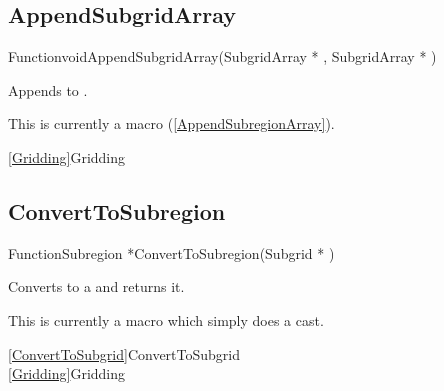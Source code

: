 \newpage
\subsection{AppendSubgridArray}
\label{AppendSubgridArray}


\begin{deftypefn}{Function}{void}{AppendSubgridArray}({SubgridArray *} , {SubgridArray *} )

\DESCRIPTION
Appends  to .

\NOTES
This is currently a macro (\ref{AppendSubregionArray}).

\SEEALSO
\vref{Gridding}{Gridding}

\end{deftypefn}


\newpage
\subsection{ConvertToSubregion}
\label{ConvertToSubregion}


\begin{deftypefn}{Function}{Subregion *}{ConvertToSubregion}({Subgrid *} )

\DESCRIPTION
Converts  to a  and returns it.

\NOTES
This is currently a macro which simply does a cast.

\SEEALSO
\vref{ConvertToSubgrid}{ConvertToSubgrid}\\
\vref{Gridding}{Gridding}

\end{deftypefn}


